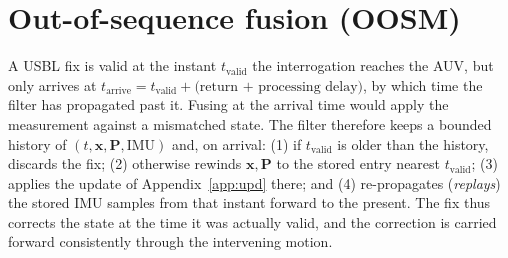 \documentclass[12pt,a4paper,oneside]{book}
\begin{document}
\section{Out-of-sequence fusion (OOSM)}
\label{app:oosm}
A USBL fix is valid at the instant $t_{\text{valid}}$ the interrogation reaches the AUV, but only arrives at
$t_{\text{arrive}}=t_{\text{valid}}+\text{(return + processing delay)}$, by which time the filter has
propagated past it. Fusing at the arrival time would apply the measurement against a mismatched state. The
filter therefore keeps a bounded history of $(t,\mathbf{x},\mathbf{P},\text{IMU})$ and, on arrival: (1) if
$t_{\text{valid}}$ is older than the history, discards the fix; (2) otherwise rewinds $\mathbf{x},\mathbf{P}$
to the stored entry nearest $t_{\text{valid}}$; (3) applies the update of Appendix~\ref{app:upd} there; and
(4) re-propagates (\emph{replays}) the stored IMU samples from that instant forward to the present. The fix
thus corrects the state at the time it was actually valid, and the correction is carried forward
consistently through the intervening motion.

\printbibliography[heading=bibintoc]
\end{document}
